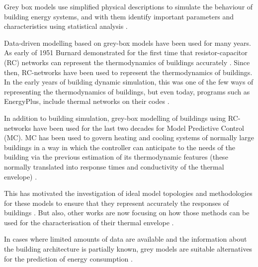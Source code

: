 \documentclass[10pt, conference, compsocconf]{IEEEtran}
\begin{document}
Grey box models use simplified physical descriptions to simulate the behaviour of building energy systems, and with them identify important parameters and characteristics using statistical analysis \cite{handbook2017american}.

Data-driven modelling based on grey-box models have been used for many years. As early of 1951 Burnard demonstrated for the first time that resistor-capacitor (RC) networks can represent the thermodynamics of buildings accurately \cite{burnand1952study}. Since then, RC-networks have been used to represent the thermodynamics of buildings. In the early years of building dynamic simulation, this was one of the few ways of representing the thermodynamics of buildings, but even today, programs such as EnergyPlus, include thermal networks on their codes \cite{handbook2017american} .

In addition to building simulation, grey-box modelling of buildings using RC-networks have been used for the last two decades for Model Predictive Control (MC). MC has been used to govern heating and cooling systems of normally large buildings in a way in which the controller can anticipate to the needs of the building via the previous estimation of its thermodynamic features (these normally translated into response times and conductivity of the thermal envelope) \cite{coley1992second}.

This has motivated the investigation of ideal model topologies and methodologies for these models to ensure that they represent accurately the responses of buildings \cite{bacher2011identifying}. But also, other works are now focusing on how those methods can be used for the characterisation of their thermal envelope \cite{ramallo2017reliability}.

In cases where limited amounts of data are available and the information about the building architecture is partially known, grey models are suitable alternatives for the prediction of energy consumption \cite{hamzacebi2014forecasting}.








\end{document}
